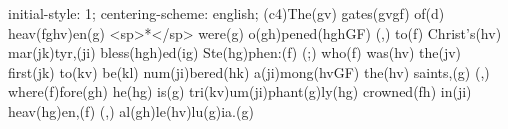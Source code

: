 initial-style: 1;
centering-scheme: english;
(c4)The(gv) gates(gvgf) of(d) heav(fghv)en(g) <sp>*</sp> were(g) o(gh)pened(hghGF) (,) to(f) Christ's(hv) mar(jk)tyr,(ji) bless(hgh)ed(ig) Ste(hg)phen:(f) (;) who(f) was(hv) the(jv) first(jk) to(kv) be(kl) num(ji)bered(hk) a(ji)mong(hvGF) the(hv) saints,(g) (,) where(f)fore(gh) he(hg) is(g) tri(kv)um(ji)phant(g)ly(hg) crowned(fh) in(ji) heav(hg)en,(f) (,) al(gh)le(hv)lu(g)ia.(g)

